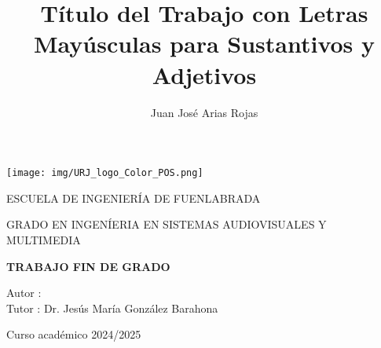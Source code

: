 \documentclass[a4paper, 12pt]{book}
\title{Título del Trabajo con Letras Mayúsculas para Sustantivos y Adjetivos}
\author{Juan José Arias Rojas}
\makeatletter
\let\thetitle\@title
\let\theauthor\@author
\makeatother
\begin{document}
\renewcommand{\refname}{Bibliografía}  %
\renewcommand{\appendixname}{Apéndice}



\begin{titlepage}
	\begin{center}
		\texttt{[image: img/URJ\_logo\_Color\_POS.png]}

		\vspace{1.75cm}

		\LARGE
		ESCUELA DE INGENIERÍA DE FUENLABRADA
		\vspace{1cm}

		\LARGE
		GRADO EN INGENÍERIA EN SISTEMAS AUDIOVISUALES Y MULTIMEDIA

		\vspace{1cm}
		\LARGE
		\textbf{TRABAJO FIN DE GRADO}

		\vspace{2cm}

		\Large
		\MakeUppercase{\thetitle}

		\vspace{2cm}

		\large
		Autor : \theauthor \\
		Tutor : Dr. Jesús María González Barahona\\
		\vspace{1cm}

		\large
		Curso académico 2024/2025

	\end{center}
\end{titlepage}

\newpage
\mbox{}
\thispagestyle{empty} %



\clearpage
{}
\chapter*{}

\vspace{12cm}

\end{document}
